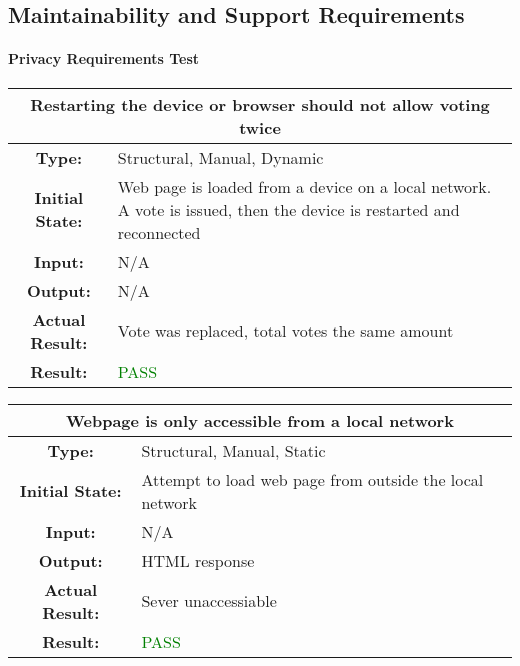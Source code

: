 \documentclass[12pt, titlepage]{article}
\begin{document}
\subsection{Maintainability and Support Requirements}

\paragraph{Privacy Requirements Test}

\begin{center}
\begin{table}[H]
\begin{tabularx}{\textwidth}{| c X |}
\hline
\multicolumn{2}{|c|}{\textbf {Restarting the device or browser should not allow voting twice}}\\
\hline
\textbf{Type: } & Structural, Manual, Dynamic\\
\textbf{Initial State: } & Web page is loaded from a device on a local network. A vote is issued, then the device is restarted and reconnected\\
\textbf{Input: } & N/A\\
\textbf{Output: } & N/A \\
\textbf{Actual Result:  } & Vote was replaced, total votes the same amount \\
\textbf{Result: } & \textcolor{green}{PASS}\\
\hline
\end{tabularx}
\end{table}
\end{center}

\begin{center}
\begin{table}[H]
\begin{tabularx}{\textwidth}{| c X |}
\hline
\multicolumn{2}{|c|}{\textbf{Webpage is only accessible from a local network}}\\
\hline
\textbf{Type: } & Structural, Manual, Static\\
\textbf{Initial State: } & Attempt to load web page from outside the local network\\
\textbf{Input: } & N/A\\
\textbf{Output: } & HTML response \\
\textbf{Actual Result:  } & Sever unaccessiable \\
\textbf{Result: } & \textcolor{green}{PASS}\\
\hline
\end{tabularx}
\end{table}
\end{center}
\end{document}

